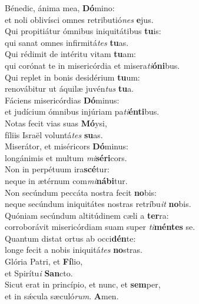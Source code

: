\evenverse Bénedic, ánima mea, \textbf{Dó}mino:~\*\\
\evenverse et noli oblivísci omnes retributió\textit{nes} \textbf{e}jus.\\
\oddverse Qui propitiátur ómnibus iniquitátibus \textbf{tu}is:~\*\\
\oddverse qui sanat omnes infirmitá\textit{tes} \textbf{tu}as.\\
\evenverse Qui rédimit de intéritu vitam \textbf{tu}am:~\*\\
\evenverse qui corónat te in misericórdia et misera\textit{ti}\textbf{ó}\textbf{ni}bus.\\
\oddverse Qui replet in bonis desidérium \textbf{tu}um:~\*\\
\oddverse renovábitur ut áquilæ juvén\textit{tus} \textbf{tu}a.\\
\evenverse Fáciens misericórdias \textbf{Dó}minus:~\*\\
\evenverse et judícium ómnibus injúriam pa\textit{ti}\textbf{én}\textbf{ti}bus.\\
\oddverse Notas fecit vias suas \textbf{Mó}ysi,~\*\\
\oddverse fíliis Israël voluntá\textit{tes} \textbf{su}as.\\
\evenverse Miserátor, et miséricors \textbf{Dó}minus:~\*\\
\evenverse longánimis et multum \textit{mi}\textbf{sé}\textbf{ri}cors.\\
\oddverse Non in perpétuum ira\textbf{scé}tur:~\*\\
\oddverse neque in ætérnum com\textit{mi}\textbf{ná}\textbf{bi}tur.\\
\evenverse Non secúndum peccáta nostra fecit \textbf{no}bis:~\*\\
\evenverse neque secúndum iniquitátes nostras retríbu\textit{it} \textbf{no}bis.\\
\oddverse Quóniam secúndum altitúdinem cæli a \textbf{ter}ra:~\*\\
\oddverse corroborávit misericórdiam suam super \textit{ti}\textbf{mén}\textbf{tes} se.\\
\evenverse Quantum distat ortus ab occi\textbf{dén}te:~\*\\
\evenverse longe fecit a nobis iniquitá\textit{tes} \textbf{no}stras.\\
\oddverse Glória Patri, et \textbf{Fí}lio,~\*\\
\oddverse et Spirítu\textit{i} \textbf{San}cto.\\
\evenverse Sicut erat in princípio, et nunc, et \textbf{sem}per,~\*\\
\evenverse et in sǽcula sæculó\textit{rum}. \textbf{A}men.\\
